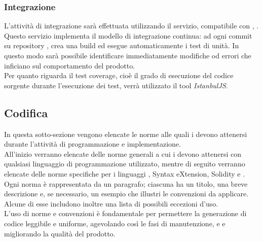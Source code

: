 \documentclass[NormeDiProgetto.tex]{subfiles}
\begin{document}
\subsubsection{Integrazione}
L'attività di integrazione sarà effettuata utilizzando il servizio, compatibile con , \textit{}.\\
Questo servizio implementa il modello di integrazione continua: ad ogni commit su repository ,  crea una build ed esegue automaticamente i test di unità. In questo modo sarà possibile identificare immediatamente modifiche od errori che inficiano sul comportamento del prodotto.\\
Per quanto riguarda il test coverage, cioè il grado di esecuzione del codice sorgente durante l'esecuzione dei test, verrà utilizzato il tool  \textit{IstanbulJS}. 

\subsection{Codifica}
In questa sotto-sezione vengono elencate le norme alle quali i \progri devono attenersi durante l'attività di programmazione e implementazione.\\
All'inizio verranno elencate delle norme generali a cui i \progri devono attenersi con qualsiasi linguaggio di programmazione utilizzato, mentre di seguito verranno elencate delle norme specifiche per i linguaggi ,  Syntax eXtension, Solidity e .\\
Ogni norma è rappresentata da un paragrafo; ciascuna ha un titolo, una breve descrizione e, se necessario, un esempio che illustri le convenzioni da applicare. Alcune di esse includono inoltre una lista di possibili eccezioni d'uso.\\
L'uso di norme e convenzioni è fondamentale per permettere la generazione di codice leggibile e uniforme, agevolando così le fasi di manutenzione,  e  e migliorando la qualità del prodotto.
\end{document}
